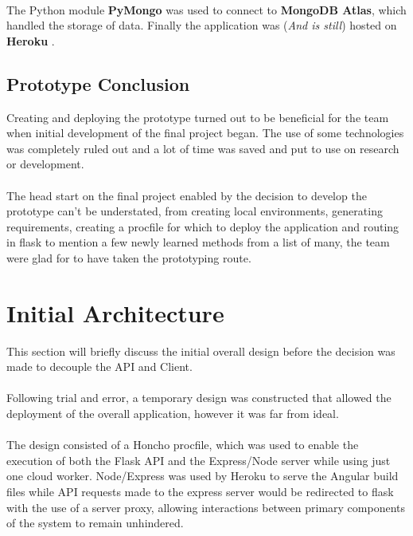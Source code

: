 \paragraph{}
The Python module \textbf{PyMongo} was used to connect to \textbf{MongoDB Atlas}, which handled the storage of data. Finally the application was (\textit{And is still}) hosted on \textbf{Heroku} \cite{PROTOTYPE_HEROKU}. 

\subsection{Prototype Conclusion}
Creating and deploying the prototype turned out to be beneficial for the team when initial development of the final project began. The use of some technologies was completely ruled out and a lot of time was saved and put to use on research or development. 

\paragraph{}
The head start on the final project enabled by the decision to develop the prototype can't be understated, from creating local environments, generating requirements, creating a procfile for which to deploy the application and routing in flask to mention a few newly learned methods from a list of many, the team were glad for to have taken the prototyping route.

\section{Initial Architecture}
This section will briefly discuss the initial overall design before the decision was made to decouple the API and Client. 

\paragraph{}
Following trial and error, a temporary design was constructed that allowed the deployment of the overall application, however it was far from ideal. 

\paragraph{}
The design consisted of a Honcho procfile, which was used to enable the execution of both the Flask API and the Express/Node server while using just one cloud worker. Node/Express was used by Heroku to serve the Angular build files while API requests made to the express server would be redirected to flask with the use of a server proxy, allowing interactions between primary components of the system to remain unhindered. 


